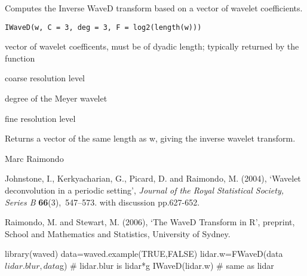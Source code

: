 \documentclass{article}
\begin{document}
\begin{Description}\relax
Computes the Inverse WaveD transform
based on a vector of wavelet coefficients.
\end{Description}
\begin{Usage}
\begin{verbatim}
IWaveD(w, C = 3, deg = 3, F = log2(length(w)))
\end{verbatim}
\end{Usage}
\begin{Arguments}
\begin{ldescription}
\item[\code{w}] vector of wavelet coefficents, must be of dyadic length; typically returned by the function 
\item[\code{C}] coarse resolution level
\item[\code{deg}] degree of the Meyer wavelet
\item[\code{F}] fine resolution level
\end{ldescription}
\end{Arguments}
\begin{Value}
Returns a vector of the same length as w, giving the inverse wavelet transform.
\end{Value}
\begin{Author}\relax
Marc Raimondo
\end{Author}
\begin{References}\relax
Johnstone, I., Kerkyacharian, G., Picard, D. and Raimondo, M.  (2004), 
`Wavelet deconvolution in a periodic
setting', {\em Journal of the Royal Statistical Society, Series B} {\bf
66}(3),~547--573.  with discussion pp.627-652.

Raimondo, M. and Stewart, M. (2006),
`The WaveD Transform in R', preprint, School and Mathematics and Statistics,
University of Sydney.
\end{References}
\begin{SeeAlso}\relax
{}
\end{SeeAlso}
\begin{Examples}
\begin{ExampleCode}
library(waved)
data=waved.example(TRUE,FALSE)
lidar.w=FWaveD(data$lidar.blur,data$g)  # lidar.blur is lidar*g 
IWaveD(lidar.w)               # same as lidar
\end{ExampleCode}
\end{Examples}
\end{document}
